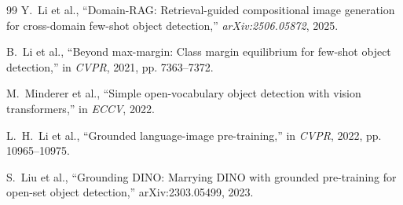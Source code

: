 \documentclass[conference]{IEEEtran}
\begin{document}
\begin{thebibliography}{99}
Y.~Li et al., ``Domain-RAG: Retrieval-guided compositional image generation for cross-domain few-shot object detection,'' \emph{arXiv:2506.05872}, 2025.

B.~Li et al., ``Beyond max-margin: Class margin equilibrium for few-shot object detection,'' in \emph{CVPR}, 2021, pp. 7363--7372.

M.~Minderer et al., ``Simple open-vocabulary object detection with vision transformers,'' in \emph{ECCV}, 2022.

L.~H.~Li et al., ``Grounded language-image pre-training,'' in \emph{CVPR}, 2022, pp. 10965--10975.

S.~Liu et al., ``Grounding DINO: Marrying DINO with grounded pre-training for open-set object detection,'' arXiv:2303.05499, 2023.

\end{thebibliography}
\end{document}
